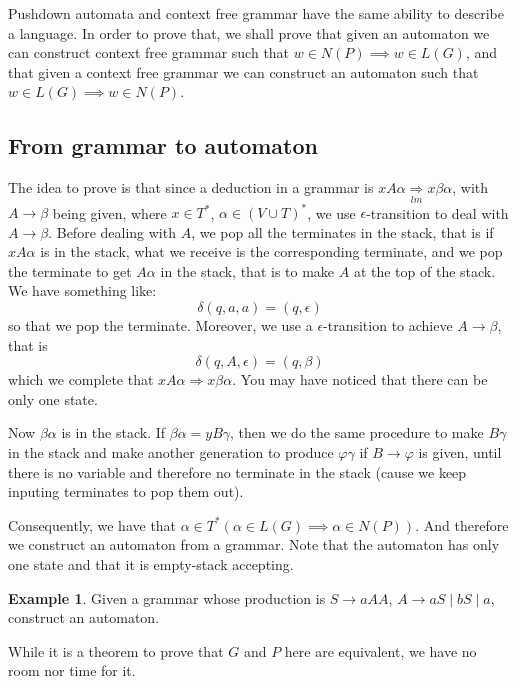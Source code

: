 \documentclass[12pt]{article}
\theoremstyle{definition}
\newtheorem{exam}[definition]{Example}
\theoremstyle{remark}
\begin{document}
Pushdown automata and context free grammar have the same ability to describe a 
language. In order to prove that, we shall prove that given an automaton we can construct 
context free grammar such that \(w \in N(P) \implies w \in L (G)\), and that given a
context free grammar we can construct an automaton such that \( w \in L (G) \implies w \in N (P)\).

\subsection{From grammar to automaton}
The  
%
%
idea to prove is that since a deduction in a grammar is \(x A\alpha \underset{l m}{\Rightarrow} x\beta\alpha\), with \( A \to\beta\) being given, where 
\(x\in T^{*}\), \(\alpha \in (V \cup T) ^{*}\), we use \(\epsilon\)-transition to deal with \(A \to\beta\). Before dealing with \(A\), we pop all the terminates in the stack, that is if \(x A\alpha\) is in the 
stack, what we receive is the corresponding terminate, and we pop the terminate to get \( A\alpha\) in the stack, that is to make \(A\) at the top of the stack. We have something like: 
\[
	\delta (q , a , a) = (q ,\epsilon)
\] 
so that we pop the terminate. Moreover, we use a \(\epsilon\)-transition to achieve \(A \to\beta\), that is \[\delta (q , A,\epsilon) = (q,\beta)\]which we complete that \( x A\alpha \Rightarrow x\beta\alpha\). You may have noticed that there can be only one state. 

Now \(\beta\alpha\) is in the stack. If \(\beta\alpha  = y B\gamma\), then we do the same procedure to make \(B\gamma\) in the stack and make another generation to produce \( \varphi\gamma\) if \(B \to \varphi\) is given, until there is no variable and therefore no terminate in the stack (cause we keep inputing terminates to pop them out). 

Consequently, we have that \(\alpha \in T ^{*} (\alpha \in L(G) \implies\alpha \in N (P))\).
And therefore we construct an automaton from a grammar. Note that the automaton has only one state and that it is empty-stack accepting. 

\begin{exam}
	Given a grammar whose production is \(S \to a  A  A \), \(A \to a S \mid b S \mid a\), construct an automaton.
\end{exam}
While it is a theorem to prove that \(G\) and \(P\) here are equivalent, we have no room nor time for it. 
\end{document}
